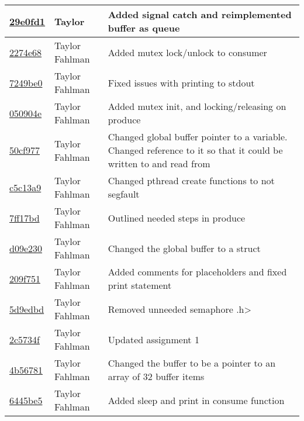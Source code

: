 \begin{tabular}{l l l}
\href{git@github.com:fahlmant/cs444/commit/29e0fd1c29a38fec3bd5a999d8bf8efa513c70fd}{29e0fd1} & Taylor & Added signal catch and reimplemented buffer as queue\\\hline
\href{git@github.com:fahlmant/cs444/commit/2274e684608cf836dc48bda6d3ec5d5d9b66f5fb}{2274e68} & Taylor Fahlman & Added mutex lock/unlock to consumer\\\hline
\href{git@github.com:fahlmant/cs444/commit/7249be01ba7edbda6723b5acbe59f46efa2886a9}{7249be0} & Taylor Fahlman & Fixed issues with printing to stdout\\\hline
\href{git@github.com:fahlmant/cs444/commit/050904eeb0342d93e297fec347a08544cc99ce07}{050904e} & Taylor Fahlman & Added mutex init, and locking/releasing on produce\\\hline
\href{git@github.com:fahlmant/cs444/commit/50cf97754d7e3aa081ef30f56af307d2671969ff}{50cf977} & Taylor Fahlman & Changed global buffer pointer to a variable. Changed reference to it so that it could be written to and read from\\\hline
\href{git@github.com:fahlmant/cs444/commit/c5c13a973ba6f8363baf95b9e2330ea4dca16651}{c5c13a9} & Taylor Fahlman & Changed pthread create functions to not segfault\\\hline
\href{git@github.com:fahlmant/cs444/commit/7ff17bdada1706eb1057ba678bde47c8f5b18774}{7ff17bd} & Taylor Fahlman & Outlined needed steps in produce\\\hline
\href{git@github.com:fahlmant/cs444/commit/d09e23095844c4b70beb8f084938a6716eb11f24}{d09e230} & Taylor Fahlman & Changed the global buffer to a struct\\\hline
\href{git@github.com:fahlmant/cs444/commit/209f7513f40020a3ae61565dd7f115b7c72b8472}{209f751} & Taylor Fahlman & Added comments for placeholders and fixed print statement\\\hline
\href{git@github.com:fahlmant/cs444/commit/5d9edbd4229b7263d39225f1ec581258af623a3d}{5d9edbd} & Taylor Fahlman & Removed unneeded semaphore .h>\\\hline
\href{git@github.com:fahlmant/cs444/commit/2c5734f5d2cbbf0650eefb5acbf3da30c458f406}{2c5734f} & Taylor Fahlman & Updated assignment 1\\\hline
\href{git@github.com:fahlmant/cs444/commit/4b56781b7d05dd3c5653e92d8b3bfe43374a4190}{4b56781} & Taylor Fahlman & Changed the buffer to be a pointer to an array of 32 buffer items\\\hline
\href{git@github.com:fahlmant/cs444/commit/6445be50d9acb170ec3adaa80fe9418b160faf23}{6445be5} & Taylor Fahlman & Added sleep and print in consume function\\\hline

\end{tabular}
